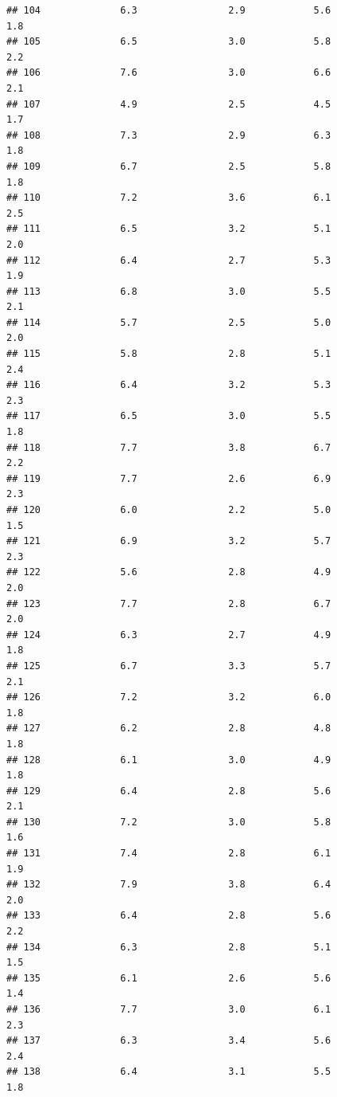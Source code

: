 \documentclass[
]{book}
\theoremstyle{plain}
\theoremstyle{definition}
\theoremstyle{definition}
\theoremstyle{definition}
\theoremstyle{definition}
\theoremstyle{definition}
\theoremstyle{remark}
\begin{document}
\begin{verbatim}
## 104              6.3                2.9            5.6              1.8
## 105              6.5                3.0            5.8              2.2
## 106              7.6                3.0            6.6              2.1
## 107              4.9                2.5            4.5              1.7
## 108              7.3                2.9            6.3              1.8
## 109              6.7                2.5            5.8              1.8
## 110              7.2                3.6            6.1              2.5
## 111              6.5                3.2            5.1              2.0
## 112              6.4                2.7            5.3              1.9
## 113              6.8                3.0            5.5              2.1
## 114              5.7                2.5            5.0              2.0
## 115              5.8                2.8            5.1              2.4
## 116              6.4                3.2            5.3              2.3
## 117              6.5                3.0            5.5              1.8
## 118              7.7                3.8            6.7              2.2
## 119              7.7                2.6            6.9              2.3
## 120              6.0                2.2            5.0              1.5
## 121              6.9                3.2            5.7              2.3
## 122              5.6                2.8            4.9              2.0
## 123              7.7                2.8            6.7              2.0
## 124              6.3                2.7            4.9              1.8
## 125              6.7                3.3            5.7              2.1
## 126              7.2                3.2            6.0              1.8
## 127              6.2                2.8            4.8              1.8
## 128              6.1                3.0            4.9              1.8
## 129              6.4                2.8            5.6              2.1
## 130              7.2                3.0            5.8              1.6
## 131              7.4                2.8            6.1              1.9
## 132              7.9                3.8            6.4              2.0
## 133              6.4                2.8            5.6              2.2
## 134              6.3                2.8            5.1              1.5
## 135              6.1                2.6            5.6              1.4
## 136              7.7                3.0            6.1              2.3
## 137              6.3                3.4            5.6              2.4
## 138              6.4                3.1            5.5              1.8

\end{verbatim}
\end{document}
